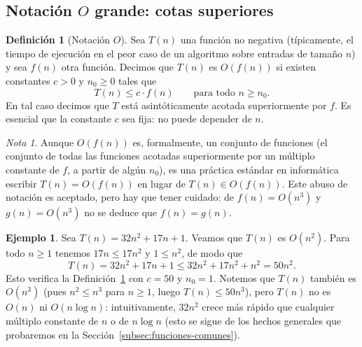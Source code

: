 \documentclass[12pt, spanish, oneside, openany]{book}
\theoremstyle{uprightplain}
\theoremstyle{definition}
\newtheorem{definicion}[teorema]{Definición}
\newtheorem{ejemplo}[teorema]{Ejemplo}
\theoremstyle{remark}
\newtheorem{nota}[teorema]{Nota}
\theoremstyle{definition}
\begin{document}
\subsection{Notación $O$ grande: cotas superiores}

\begin{definicion}[Notación $O$]
\label{def:notacion-O}
Sea $T(n)$ una función no negativa (típicamente, el tiempo de ejecución en el peor caso de un algoritmo sobre entradas de tamaño $n$) y sea $f(n)$ otra función. Decimos que $T(n)$ es $O(f(n))$ si existen constantes $c>0$ y $n_0\ge 0$ tales que
\[
T(n) \le c\cdot f(n) \qquad \text{para todo } n\ge n_0.
\]
En tal caso decimos que $T$ está asintóticamente acotada superiormente por $f$. Es esencial que la constante $c$ sea fija: no puede depender de $n$.
\end{definicion}

\begin{nota}
Aunque $O(f(n))$ es, formalmente, un conjunto de funciones (el conjunto de todas las funciones acotadas superiormente por un múltiplo constante de $f$, a partir de algún $n_0$), es una práctica estándar en informática escribir $T(n)=O(f(n))$ en lugar de $T(n)\in O(f(n))$. Este abuso de notación es aceptado, pero hay que tener cuidado: de $f(n)=O(n^3)$ y $g(n)=O(n^3)$ no se deduce que $f(n)=g(n)$.
\end{nota}

\begin{ejemplo}
\label{ej:O-cuadratico}
Sea $T(n)=32n^2+17n+1$. Veamos que $T(n)$ es $O(n^2)$. Para todo $n\ge 1$ tenemos $17n\le 17n^2$ y $1\le n^2$, de modo que
\[
T(n) = 32n^2+17n+1 \le 32n^2+17n^2+n^2 = 50n^2.
\]
Esto verifica la Definición~\ref{def:notacion-O} con $c=50$ y $n_0=1$. Notemos que $T(n)$ también es $O(n^3)$ (pues $n^2\le n^3$ para $n\ge 1$, luego $T(n)\le 50n^3$), pero $T(n)$ no es $O(n)$ ni $O(n\log n)$: intuitivamente, $32n^2$ crece más rápido que cualquier múltiplo constante de $n$ o de $n\log n$ (esto se sigue de los hechos generales que probaremos en la Sección~\ref{subsec:funciones-comunes}).
\end{ejemplo}
\end{document}
